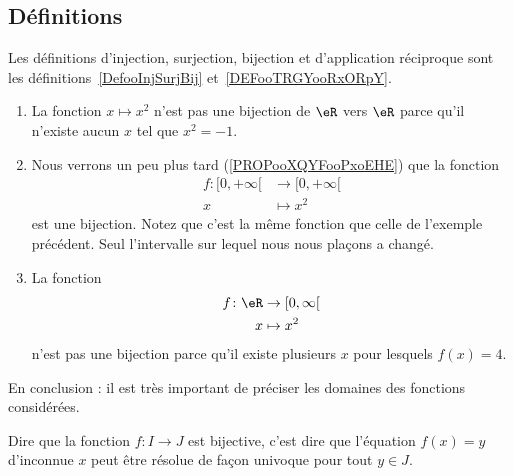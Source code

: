 \subsection{Définitions}

Les définitions d'injection, surjection, bijection et d'application réciproque sont les définitions~\ref{DefooInjSurjBij} et~\ref{DEFooTRGYooRxORpY}.

\begin{example}     \label{EXooCWYHooLEciVj}
	\begin{enumerate}
		\item
		      La fonction \( x\mapsto x^2\) n'est pas une bijection de \( \eR\) vers \( \eR\) parce qu'il n'existe aucun \( x\) tel que \( x^2=-1\).
		\item
		      Nous verrons un peu plus tard (\ref{PROPooXQYFooPxoEHE}) que la fonction
		      \begin{equation}
			      \begin{aligned}
				      f\colon \mathopen[ 0 , +\infty [ & \to \mathopen[ 0 , +\infty [ \\
				      x                                & \mapsto x^2
			      \end{aligned}
		      \end{equation}
		      est une bijection. Notez que c'est la même fonction que celle de l'exemple précédent. Seul l'intervalle sur lequel nous nous plaçons a changé.
		\item
		      La fonction
		      \begin{equation}
			      \begin{aligned}
				      f\colon \eR & \to \mathopen[ 0 , \infty \mathclose[ \\
				      x           & \mapsto x^2
			      \end{aligned}
		      \end{equation}
		      n'est pas une bijection parce qu'il existe plusieurs \( x\) pour lesquels \( f(x)=4\).
	\end{enumerate}
	En conclusion : il est très important de préciser les domaines des fonctions considérées.
\end{example}

\begin{remark}
	Dire que la fonction \( f\colon I\to J\) est bijective, c'est dire que l'équation \( f(x)=y\) d'inconnue \( x\) peut être résolue de façon univoque pour tout \( y\in J\).
\end{remark}

